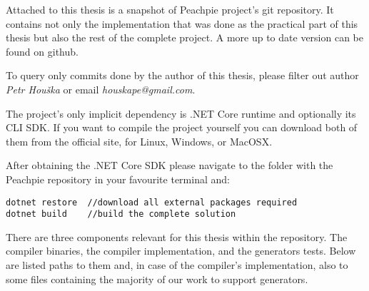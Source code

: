 
Attached to this thesis is a snapshot of Peachpie project’s git repository. It contains not only the implementation that was done as the practical part of this thesis but also the rest of the complete project. A more up to date version can be found on github\footnotemark.

To query only commits done by the author of this thesis, please filter out author \emph{Petr Houška} or email \emph{houskape@gmail.com}.


The project’s only implicit dependency is .NET Core runtime and optionally its CLI SDK. If you want to compile the project yourself you can download both of them from the official site\footnotemark, for Linux, Windows, or MacOSX.

After obtaining the .NET Core SDK please navigate to the folder with the Peachpie repository in your favourite terminal and:

\begin{verbatim}
dotnet restore  //download all external packages required
dotnet build    //build the complete solution
\end{verbatim}


There are three components relevant for this thesis within the repository. The compiler binaries, the compiler implementation, and the generators tests. Below are listed paths to them and, in case of the compiler’s implementation, also to some files containing the majority of our work to support generators.

